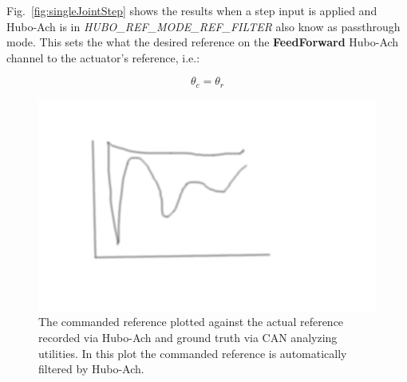 Fig.~\ref{fig:singleJointStep} shows the results when a step input is applied and Hubo-Ach is in \textit{HUBO\_REF\_MODE\_REF\_FILTER} also know as passthrough mode.
This sets the what the desired reference on the \textbf{FeedForward} Hubo-Ach channel to the actuator's reference, i.e.:

\begin{equation}
 \theta_c = \theta_r
\end{equation}




\begin{figure}[thpb]
  \centering
\includegraphics[width=0.8\columnwidth]{./pix/tmp.png}
  \caption{The commanded reference plotted against the actual reference recorded via Hubo-Ach and ground truth via CAN analyzing utilities.  In this plot the commanded reference is automatically filtered by Hubo-Ach.}
  \label{fig:singleJointStepFiltered}
\end{figure}